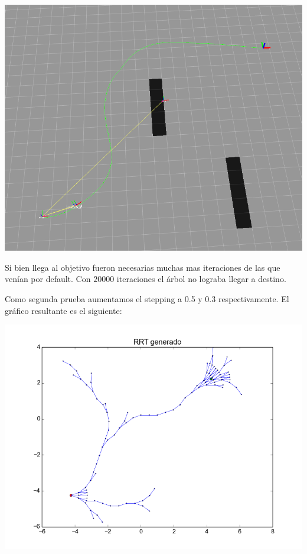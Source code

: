 \includegraphics[scale=0.3]{velocidad/stepping_Bajo_rviz1.png}

Si bien llega al objetivo fueron necesarias muchas mas iteraciones de las que venían por default. Con $20000$ iteraciones el árbol no lograba llegar a destino.

Como segunda prueba aumentamos el stepping a 0.5 y 0.3 respectivamente. El gráfico resultante es el siguiente:

\includegraphics[scale=0.5]{velocidad/stepping_alto1.png}

